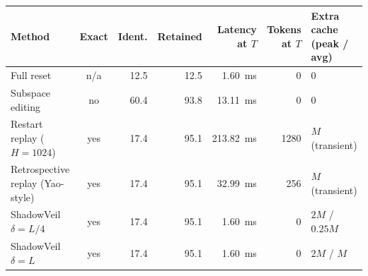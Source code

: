 \begin{tabular}{lcrrrrl}
\toprule
Method & Exact & Ident. & Retained & Latency at $T$ & Tokens at $T$ & Extra cache (peak / avg) \\
\midrule
Full reset & n/a & 12.5 & 12.5 & 1.60~ms & 0 & 0 \\
Subspace editing & no & 60.4 & 93.8 & 13.11~ms & 0 & 0 \\
Restart replay ($H{=}1024$) & yes & 17.4 & 95.1 & 213.82~ms & 1280 & $M$ (transient) \\
Retrospective replay (Yao-style) & yes & 17.4 & 95.1 & 32.99~ms & 256 & $M$ (transient) \\
ShadowVeil $\delta{=}L/4$ & yes & 17.4 & 95.1 & 1.60~ms & 0 & $2M$ / $0.25M$ \\
ShadowVeil $\delta{=}L$ & yes & 17.4 & 95.1 & 1.60~ms & 0 & $2M$ / $M$ \\
\bottomrule
\end{tabular}
